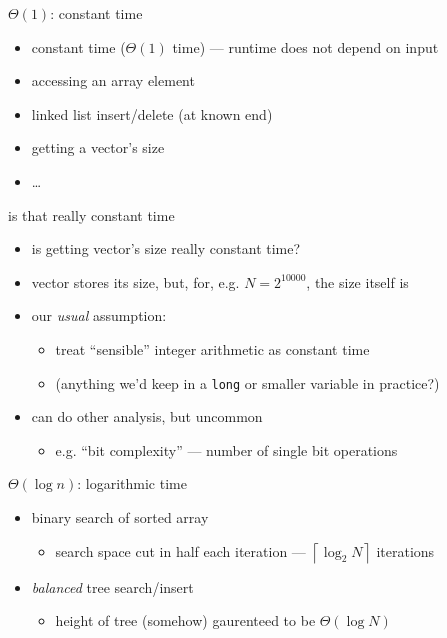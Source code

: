 \begin{frame}{$\Theta(1)$: constant time}
    \begin{itemize}
    \item constant time ($\Theta(1)$ time) --- runtime does not depend on input
    \vspace{.5cm}
    \item accessing an array element
    \item linked list insert/delete (at known end)
    \item getting a vector's size
    \item \ldots
    \end{itemize}
\end{frame}

\begin{frame}{is that really constant time}
    \begin{itemize}
    \item is getting vector's size really constant time?
    \item vector stores its size, but, for, e.g. $N=2^{10000}$, the size itself is 
    \item our \textit{usual} assumption:
        \begin{itemize}
        \item treat ``sensible'' integer arithmetic as constant time
        \item (anything we'd keep in a {\tt long} or smaller variable in practice?)
        \end{itemize}
    \item can do other analysis, but uncommon
        \begin{itemize}
        \item e.g. ``bit complexity'' --- number of single bit operations
        \end{itemize}
    \end{itemize}
\end{frame}

\begin{frame}{$\Theta(\log n)$: logarithmic time}
    \begin{itemize}
    \item binary search of sorted array
        \begin{itemize}
        \item search space cut in half each iteration --- $\left\lceil\log_2 N\right\rceil$ iterations
        \end{itemize}
    \item \textit{balanced} tree search/insert
        \begin{itemize}
        \item height of tree (somehow) gaurenteed to be $\Theta(\log N)$
        \end{itemize}
    \end{itemize}
\end{frame}

